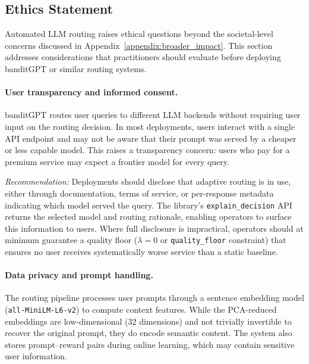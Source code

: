 
\subsection{Ethics Statement}
\label{appendix:ethics}

Automated LLM routing raises ethical questions beyond the societal-level
concerns discussed in Appendix~\ref{appendix:broader_impact}.  This section
addresses considerations that practitioners should evaluate before deploying
banditGPT or similar routing systems.

\paragraph{User transparency and informed consent.}
banditGPT routes user queries to different LLM backends without requiring
user input on the routing decision.  In most deployments, users interact
with a single API endpoint and may not be aware that their prompt was served
by a cheaper or less capable model.  This raises a transparency concern:
users who pay for a premium service may expect a frontier model for every
query.

\emph{Recommendation:}  Deployments should disclose that adaptive routing
is in use, either through documentation, terms of service, or per-response
metadata indicating which model served the query.  The library's
\texttt{explain\_decision} API returns the selected model and routing
rationale, enabling operators to surface this information to users.
Where full disclosure is impractical, operators should at minimum guarantee
a quality floor ($\lambda{=}0$ or \texttt{quality\_floor} constraint) that
ensures no user receives systematically worse service than a static
baseline.

\paragraph{Data privacy and prompt handling.}
The routing pipeline processes user prompts through a sentence embedding
model (\texttt{all-MiniLM-L6-v2}) to compute context features.  While the
PCA-reduced embeddings are low-dimensional (32 dimensions) and not trivially
invertible to recover the original prompt, they do encode semantic content.
The system also stores prompt--reward pairs during online learning, which
may contain sensitive user information.

